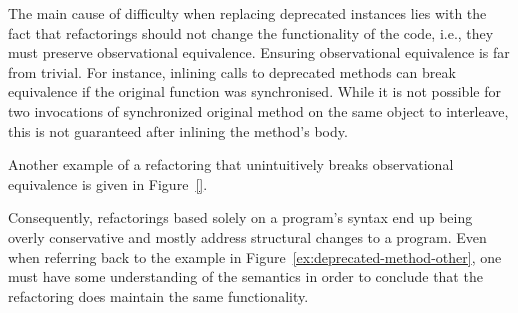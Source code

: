 \documentclass[runningheads,a4paper]{llncs}
\begin{document}
The main cause of difficulty when replacing deprecated instances lies
with the fact that refactorings should not change the functionality of
the code, i.e., they must preserve observational equivalence.
Ensuring observational equivalence is far from trivial.  For instance,
inlining calls to deprecated methods can break equivalence if the
original function was synchronised.  While it is not possible for two
invocations of synchronized original method on the same object to
interleave, this is not guaranteed after inlining the method's body.

Another example of a refactoring that unintuitively breaks
observational equivalence is given in Figure~\ref{}.

Consequently, refactorings based solely on a program's syntax end up
being overly conservative and mostly address structural changes
to a program.  Even when referring back to the example in
Figure~\ref{ex:deprecated-method-other}, one must have some
understanding of the semantics in order to conclude that the
refactoring does maintain the same functionality.



\end{document}
